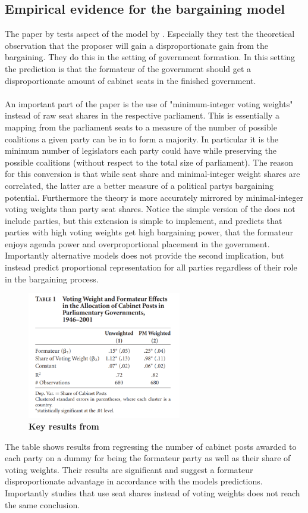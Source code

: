\subsection{Empirical evidence for the bargaining model \citep{ansolabehere_voting_2005}}
The paper by \citeauthor{ansolabehere_voting_2005} tests aspect of the model by \citeauthor{baron_bargaining_1989}. Especially they test the theoretical observation that the proposer will gain a disproportionate gain from the bargaining. They do this in the setting of government formation. In this setting the prediction is that the formateur of the government should get a disproportionate amount of cabinet seats in the finished government. 
\\ \\ 
An important part of the paper is the use of "minimum-integer voting weights" instead of raw seat shares in the respective parliament. This is essentially a mapping from the parliament seats to a measure of the number of possible coalitions a given party can be in to form a majority. In particular it is the minimum number of legislators each party could have while preserving the possible coalitions (without respect to the total size of parliament). The reason for this conversion is that while seat share and minimal-integer weight shares are correlated, the latter are a better measure of a political partys bargaining potential. Furthermore the theory is more accurately mirrored by minimal-integer voting weights than party seat shares. Notice the simple version of the \citeauthor{baron_bargaining_1989} does not include parties, but this extension is simple to implement, and predicts that parties with high voting weights get high bargaining power, that the formateur enjoys agenda power and overproportional placement in the government. Importantly alternative models does not provide the second implication, but instead predict proportional representation for all parties regardless of their role in the bargaining process.

\begin{figure}
    \includegraphics[width=0.6\textwidth]{figures/ansolres.png}
    \caption{\textbf{Key results from \cite{ansolabehere_voting_2005}}}
\end{figure}

The table shows results from regressing the number of cabinet posts awarded to each party on a dummy for being the formateur party as well as their share of voting weights. Their results are significant and suggest a formateur disproportionate advantage in accordance with the models predictions. Importantly studies that use seat shares instead of voting weights does not reach the same conclusion. 